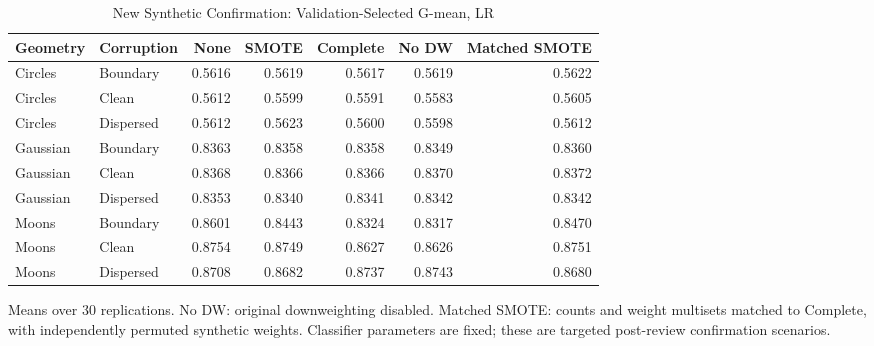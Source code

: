 \begin{table}[t]
\caption{New Synthetic Confirmation: Validation-Selected G-mean, LR}
\centering\small
\begin{tabular}{llrrrrr}
\hline
Geometry & Corruption & None & SMOTE & Complete & No DW & Matched SMOTE\\
\hline
Circles & Boundary & 0.5616 & 0.5619 & 0.5617 & 0.5619 & 0.5622 \\
Circles & Clean & 0.5612 & 0.5599 & 0.5591 & 0.5583 & 0.5605 \\
Circles & Dispersed & 0.5612 & 0.5623 & 0.5600 & 0.5598 & 0.5612 \\
Gaussian & Boundary & 0.8363 & 0.8358 & 0.8358 & 0.8349 & 0.8360 \\
Gaussian & Clean & 0.8368 & 0.8366 & 0.8366 & 0.8370 & 0.8372 \\
Gaussian & Dispersed & 0.8353 & 0.8340 & 0.8341 & 0.8342 & 0.8342 \\
Moons & Boundary & 0.8601 & 0.8443 & 0.8324 & 0.8317 & 0.8470 \\
Moons & Clean & 0.8754 & 0.8749 & 0.8627 & 0.8626 & 0.8751 \\
Moons & Dispersed & 0.8708 & 0.8682 & 0.8737 & 0.8743 & 0.8680 \\
\hline
\end{tabular}
\par\smallskip\footnotesize Means over 30 replications. No DW: original downweighting disabled. Matched SMOTE: counts and weight multisets matched to Complete, with independently permuted synthetic weights. Classifier parameters are fixed; these are targeted post-review confirmation scenarios.
\end{table}

